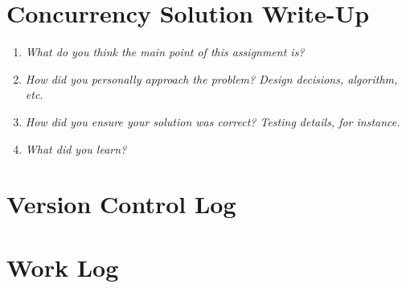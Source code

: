 \documentclass[letterpaper, onecolumn, draftclsnofoot, 10pt, compsoc]{IEEEtran}
\begin{document}
\section{Concurrency Solution Write-Up}
    \begin{singlespace}
    \par
        \begin{enumerate}
            \item \textit{What do you think the main point of this assignment is?}\par
            \par
            \item \textit{How did you personally approach the problem? Design decisions, algorithm, etc.}\par
            \par
            \item \textit{How did you ensure your solution was correct? Testing details, for instance.}\par
            \par
            \item \textit{What did you learn?}\par
            \par
        \end{enumerate}
    \end{singlespace}

\section{Version Control Log}

\section{Work Log}

%
\end{document}
